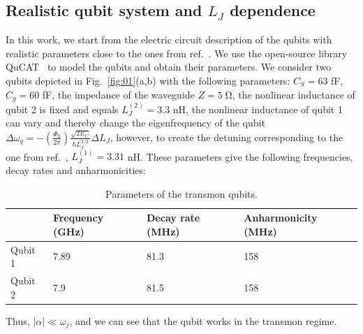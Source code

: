 \documentclass[lettersize,journal]{IEEEtran}
\begin{document}
\subsection{Realistic qubit system and $L_J$ dependence}

In this work, we start from the electric circuit description of the qubits with realistic parameters close to the ones from ref.~\cite{rosario_hamann_nonreciprocity_2018}.
We use the open-source library QuCAT~\cite{gely_qucat_2020} to model the qubits and obtain their parameters.
We consider two qubits depicted in Fig.~\ref{fig:01}(a,b) with the following parameters: $C_S = 63$ fF, $C_g = 60$ fF, the impedance of the waveguide $Z = 5 \; \mathrm{\Omega}$, the nonlinear inductance of qubit 2 is fixed and equals $L_J^{(2)} = 3.3$ nH, the nonlinear inductance of qubit 1 can vary and thereby change the eigenfrequency of the qubit $\Delta \omega_q = - \left( \frac{\Phi_0}{2 \pi} \right) \frac{\sqrt{2 E_C}}{\hbar L_J^{3/2}} \Delta L_J$, however, to create the detuning corresponding to the one from ref.~\cite{rosario_hamann_nonreciprocity_2018}, $L_J^{(1)} = 3.31$ nH.
These parameters give the following frequencies, decay rates and anharmonicities:
\begin{table}[h!]
\centering
\caption{Parameters of the transmon qubits.}
\begin{tabular}{||m{1cm} m{1.6cm} m{1.6cm} m{1.6cm}||} 
 \hline
 & Frequency (GHz) & Decay rate (MHz) & Anharmonicity (MHz) \\
 \hline\hline
 Qubit 1 & 7.89 & 81.3 & 158 \\
 \hline
 Qubit 2 & 7.9 & 81.5 & 158 \\
 \hline
\end{tabular}
\label{tab:01}
\end{table}
Thus, $|\alpha| \ll \omega_j$, and we can see that the qubit works in the transmon regime.
\end{document}
